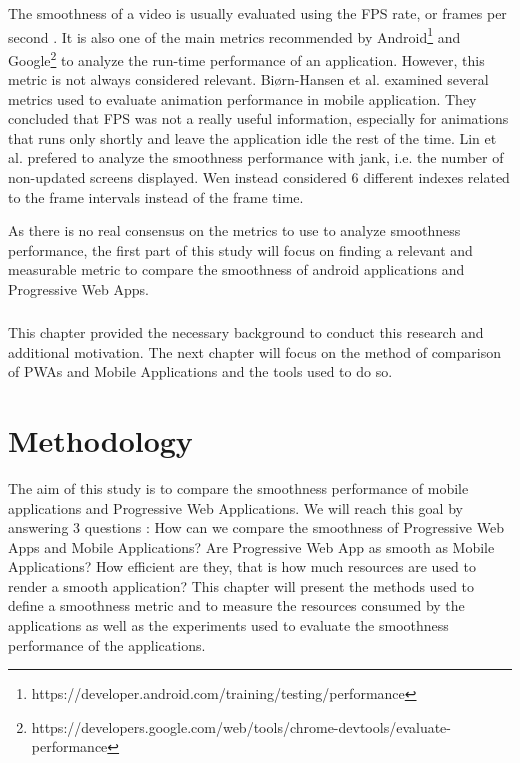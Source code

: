 \documentclass{kththesis}
\begin{document}
The smoothness of a video is usually evaluated using the FPS rate, or frames per second \cite{smooth_gui}. It is also one of the main metrics recommended by Android\footnote{https://developer.android.com/training/testing/performance} and Google\footnote{https://developers.google.com/web/tools/chrome-devtools/evaluate-performance} to analyze the run-time performance of an application.\newline
However, this metric is not always considered relevant. Biørn-Hansen et al. \cite{animation_performance} examined several metrics used to evaluate animation performance in mobile application. They concluded that FPS was not a really useful information, especially for animations that runs only shortly and leave the application idle the rest of the time. Lin et al.\cite{smooth_gui} prefered to 
analyze the smoothness performance with jank, i.e. the number of non-updated screens displayed. Wen \cite{smoothnessQoE} instead considered 6 different indexes related to the frame intervals instead of the frame time. 

As there is no real consensus on the metrics to use to analyze smoothness performance,  the first part of this study will focus on finding a relevant and measurable metric to compare the smoothness of android applications and Progressive Web Apps.




\paragraph{}
This chapter provided the necessary background to conduct this research and additional motivation. The next chapter will focus on the method of comparison of PWAs and Mobile Applications and the tools used to do so.
    

\chapter{Methodology}

The aim of this study is to compare the smoothness performance of mobile applications and Progressive Web Applications. We will reach this goal by answering 3 questions : How can we compare the smoothness of Progressive Web Apps and Mobile Applications? Are Progressive Web App as smooth as Mobile Applications? How efficient are they, that is how much resources are used to render a smooth application? \newline
This chapter will present the methods used to define a smoothness metric and to measure the resources consumed by the applications as well as the experiments used to evaluate the smoothness performance of the applications.
\end{document}

